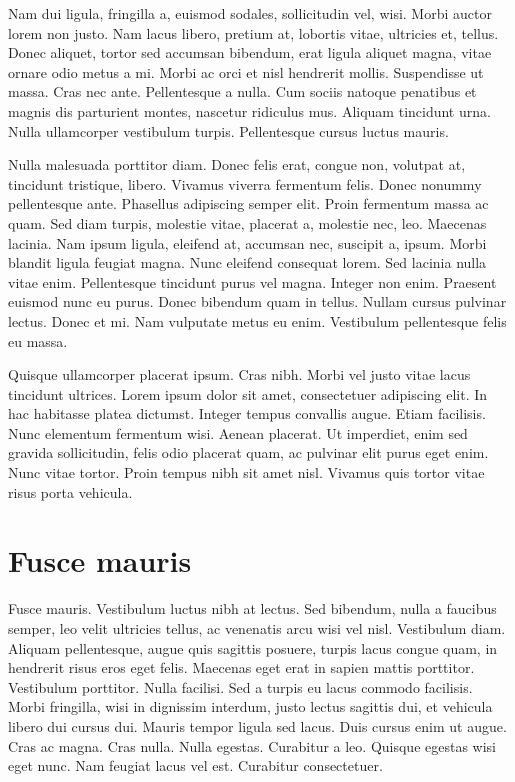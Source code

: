   Nam dui ligula, fringilla a, euismod sodales, sollicitudin vel,
  wisi. Morbi auctor lorem non justo. Nam lacus libero, pretium at,
  lobortis vitae, ultricies et, tellus. Donec aliquet, tortor sed
  accumsan bibendum, erat ligula aliquet magna, vitae ornare odio metus
  a mi. Morbi ac orci et nisl hendrerit mollis. Suspendisse ut
  massa. Cras nec ante. Pellentesque a nulla.  Cum sociis natoque
  penatibus et magnis dis parturient montes, nascetur ridiculus
  mus. Aliquam tincidunt urna. Nulla ullamcorper vestibulum
  turpis. Pellentesque cursus luctus mauris.

  Nulla malesuada porttitor diam. Donec felis erat, congue non, volutpat
  at, tincidunt tristique, libero. Vivamus viverra fermentum
  felis. Donec nonummy pellentesque ante. Phasellus adipiscing semper
  elit. Proin fermentum massa ac quam. Sed diam turpis, molestie vitae,
  placerat a, molestie nec, leo. Maecenas lacinia. Nam ipsum ligula,
  eleifend at, accumsan nec, suscipit a, ipsum. Morbi blandit ligula
  feugiat magna. Nunc eleifend consequat lorem. Sed lacinia nulla vitae
  enim. Pellentesque tincidunt purus vel magna. Integer non
  enim. Praesent euismod nunc eu purus.  Donec bibendum quam in
  tellus. Nullam cursus pulvinar lectus. Donec et mi. Nam vulputate
  metus eu enim. Vestibulum pellentesque felis eu massa.

  Quisque ullamcorper placerat ipsum. Cras nibh. Morbi vel justo vitae
  lacus tincidunt ultrices. Lorem ipsum dolor sit amet, consectetuer
  adipiscing elit. In hac habitasse platea dictumst. Integer tempus
  convallis augue. Etiam facilisis. Nunc elementum fermentum
  wisi. Aenean placerat.  Ut imperdiet, enim sed gravida sollicitudin,
  felis odio placerat quam, ac pulvinar elit purus eget enim. Nunc vitae
  tortor. Proin tempus nibh sit amet nisl. Vivamus quis tortor vitae
  risus porta vehicula.

  \section{Fusce mauris}

  Fusce mauris. Vestibulum luctus nibh at lectus. Sed bibendum, nulla a
  faucibus semper, leo velit ultricies tellus, ac venenatis arcu wisi
  vel nisl.  Vestibulum diam. Aliquam pellentesque, augue quis sagittis
  posuere, turpis lacus congue quam, in hendrerit risus eros eget
  felis. Maecenas eget erat in sapien mattis porttitor. Vestibulum
  porttitor. Nulla facilisi.  Sed a turpis eu lacus commodo
  facilisis. Morbi fringilla, wisi in dignissim interdum, justo lectus
  sagittis dui, et vehicula libero dui cursus dui. Mauris tempor ligula
  sed lacus. Duis cursus enim ut augue. Cras ac magna.  Cras
  nulla. Nulla egestas. Curabitur a leo. Quisque egestas wisi eget
  nunc. Nam feugiat lacus vel est. Curabitur consectetuer.

